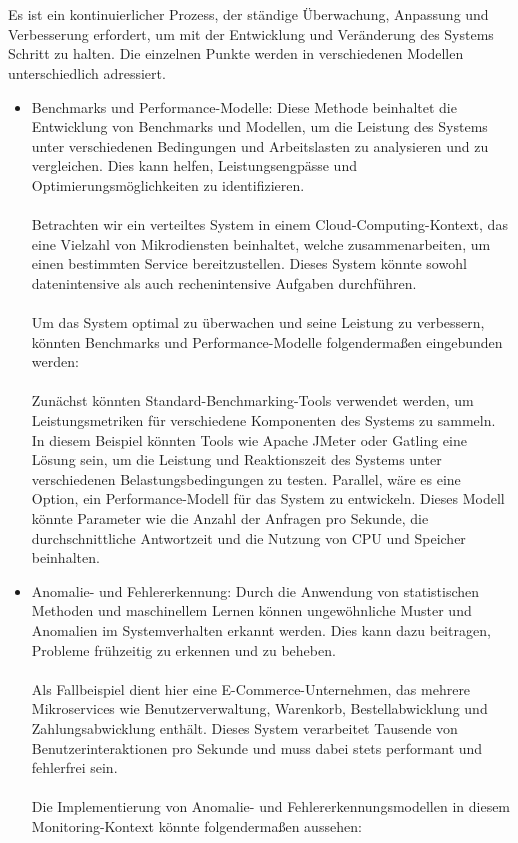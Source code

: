 \documentclass[../vs-script-first-v01.tex]{subfiles}
\begin{document}
\\\\
Es ist ein kontinuierlicher Prozess, der ständige Überwachung, Anpassung und Verbesserung erfordert, um mit der Entwicklung und Veränderung des Systems Schritt zu halten. Die einzelnen Punkte werden in verschiedenen Modellen unterschiedlich adressiert. 
\begin{itemize}
\item Benchmarks und Performance-Modelle: Diese Methode beinhaltet die Entwicklung von Benchmarks und Modellen, um die Leistung des Systems unter verschiedenen Bedingungen und Arbeitslasten zu analysieren und zu vergleichen. Dies kann helfen, Leistungsengpässe und Optimierungsmöglichkeiten zu identifizieren.
\\\\
Betrachten wir ein verteiltes System in einem Cloud-Computing-Kontext, das eine Vielzahl von Mikrodiensten beinhaltet, welche zusammenarbeiten, um einen bestimmten Service bereitzustellen. Dieses System könnte sowohl datenintensive als auch rechenintensive Aufgaben durchführen.
\\\\
Um das System optimal zu überwachen und seine Leistung zu verbessern, könnten Benchmarks und Performance-Modelle folgendermaßen eingebunden werden:
\\\\
Zunächst könnten Standard-Benchmarking-Tools verwendet werden, um Leistungsmetriken für verschiedene Komponenten des Systems zu sammeln. In diesem Beispiel könnten Tools wie Apache JMeter oder Gatling eine Lösung sein, um die Leistung und Reaktionszeit des Systems unter verschiedenen Belastungsbedingungen zu testen.
Parallel, wäre es eine Option, ein Performance-Modell für das System zu entwickeln. Dieses Modell könnte Parameter wie die Anzahl der Anfragen pro Sekunde, die durchschnittliche Antwortzeit und die Nutzung von CPU und Speicher beinhalten.

\item Anomalie- und Fehlererkennung: Durch die Anwendung von statistischen Methoden und maschinellem Lernen können ungewöhnliche Muster und Anomalien im Systemverhalten erkannt werden. Dies kann dazu beitragen, Probleme frühzeitig zu erkennen und zu beheben.
\\\\
Als Fallbeispiel dient hier eine E-Commerce-Unternehmen, das mehrere Mikroservices wie Benutzerverwaltung, Warenkorb, Bestellabwicklung und Zahlungsabwicklung enthält. Dieses System verarbeitet Tausende von Benutzerinteraktionen pro Sekunde und muss dabei stets performant und fehlerfrei sein.
\\\\
Die Implementierung von Anomalie- und Fehlererkennungsmodellen in diesem Monitoring-Kontext könnte folgendermaßen aussehen:


\end{itemize}
\end{document}
